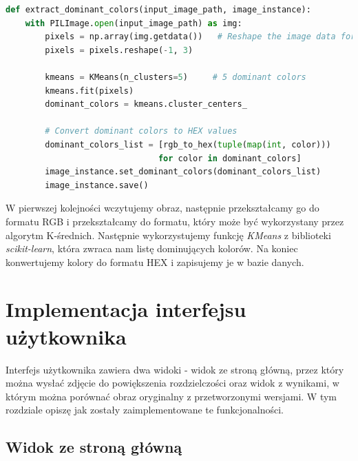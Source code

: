 \begin{lstlisting}[language=Python, caption=Implementacja algorytmu K-średnich., label={lst:kmeans}]
def extract_dominant_colors(input_image_path, image_instance):
    with PILImage.open(input_image_path) as img:
        pixels = np.array(img.getdata())   # Reshape the image data for k-means
        pixels = pixels.reshape(-1, 3)

        kmeans = KMeans(n_clusters=5)     # 5 dominant colors
        kmeans.fit(pixels)
        dominant_colors = kmeans.cluster_centers_

        # Convert dominant colors to HEX values
        dominant_colors_list = [rgb_to_hex(tuple(map(int, color))) 
                               for color in dominant_colors]
        image_instance.set_dominant_colors(dominant_colors_list)
        image_instance.save()
\end{lstlisting}

W pierwszej kolejności wczytujemy obraz, następnie przekształcamy go do formatu RGB i przekształcamy do formatu, który może być wykorzystany przez algorytm K-średnich. Następnie wykorzystujemy funkcję \textit{KMeans} z biblioteki \textit{scikit-learn}, która zwraca nam listę dominujących kolorów. Na koniec konwertujemy kolory do formatu HEX i zapisujemy je w bazie danych.



\section{Implementacja interfejsu użytkownika}

Interfejs użytkownika zawiera dwa widoki - widok ze stroną główną, przez który można wysłać zdjęcie do powiększenia rozdzielczości oraz widok z wynikami, w którym można porównać obraz oryginalny z przetworzonymi wersjami. W tym rozdziale opiszę jak zostały zaimplementowane te funkcjonalności.



\subsection*{Widok ze stroną główną}

